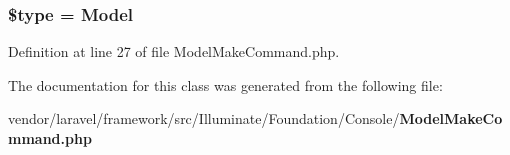 \subsubsection[{\$type}]{\setlength{\rightskip}{0pt plus 5cm}\$type = \textquotesingle{}Model\textquotesingle{}\hspace{0.3cm}{\ttfamily [protected]}}\label{class_illuminate_1_1_foundation_1_1_console_1_1_model_make_command_a9a4a6fba2208984cabb3afacadf33919}


Definition at line 27 of file Model\+Make\+Command.\+php.



The documentation for this class was generated from the following file\+:\begin{DoxyCompactItemize}
\item 
vendor/laravel/framework/src/\+Illuminate/\+Foundation/\+Console/{\bf Model\+Make\+Command.\+php}\end{DoxyCompactItemize}
